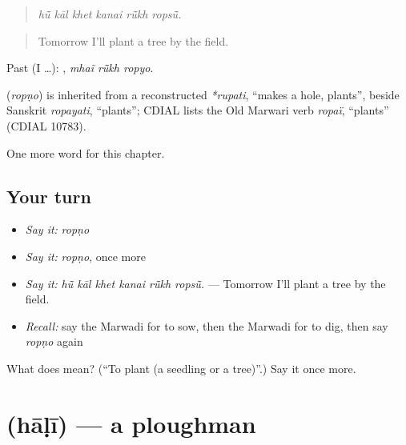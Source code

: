 \begin{quote}
     
\end{quote}

\begin{quote}
\emph{hū̃ kāl khet kanai rū̃kh ropsū̃.}
\end{quote}

\begin{quote}
Tomorrow I'll plant a tree by the field.
\end{quote}

Past (I …):   , \emph{mhaĩ rū̃kh ropyo}.

\begin{cousinweb}
\textbf{} (\emph{ropṇo}) is inherited from a reconstructed \emph{*rupati}, \textquotedblleft{}makes a hole, plants\textquotedblright{}, beside Sanskrit \emph{ropayati}, \textquotedblleft{}plants\textquotedblright{}; CDIAL lists the Old Marwari verb \emph{ropaï}, \textquotedblleft{}plants\textquotedblright{} (CDIAL 10783).
\end{cousinweb}

\begin{grammarlens}[title={What you've built}]
One more word for this chapter.
\end{grammarlens}

\subsection*{Your turn}
\begin{itemize}
\raggedright
  \item \emph{Say it:} \emph{ropṇo}
  \item \emph{Say it:} \emph{ropṇo}, once more
  \item \emph{Say it:} \emph{hū̃ kāl khet kanai rū̃kh ropsū̃.} — Tomorrow I'll plant a tree by the field.
  \item \emph{Recall:} say the Marwadi for to sow, then the Marwadi for to dig, then say \emph{ropṇo} again
\end{itemize}

\begin{tcolorbox}[breakable,colback=teal!4,colframe=teal!35!black,title={Before you move on}]
What does  mean? (\textquotedblleft{}To plant (a seedling or a tree)\textquotedblright{}.) Say it once more.
\end{tcolorbox}
\section[\texorpdfstring{\mw{हाळी} (hāḷī)}{हाळी (hāḷī)}]{ (hāḷī) — a ploughman}

